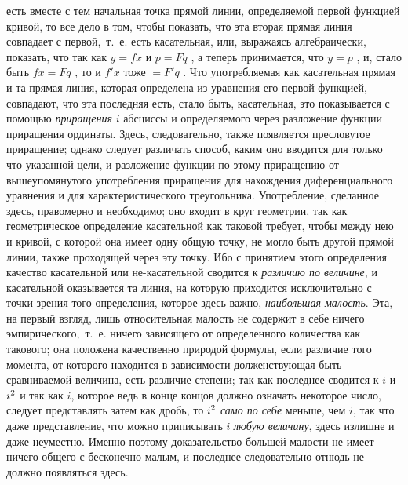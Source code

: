 {есть вместе с тем начальная точка прямой линии, определяемой первой
функцией кривой, то все дело в том, чтобы показать, что эта вторая прямая
линия совпадает с первой,~т.~е. есть касательная, или, выражаясь
алгебраически, показать, что так как $y=\mathit{fx}$  и  $p=\mathit{Fq}$ ,
а теперь принимается, что  $y=p$ , и, стало быть  $\mathit{fx}=\mathit{Fq}$
, то и  $f'x$  тоже  $=F'q$ . Что употребляемая как касательная прямая и та
прямая линия, которая определена из уравнения его первой функцией,
совпадают, что эта последняя есть, стало быть, касательная, это
показывается с помощью {\em приращения}
$i$ абсциссы и определяемого через разложение
функции приращения ординаты. Здесь, следовательно, также появляется
пресловутое приращение; однако следует различать способ, каким оно вводится
для только что указанной цели, и разложение функции по этому приращению от
вышеупомянутого употребления приращения для нахождения диференциального
уравнения и для характеристического треугольника. Употребление, сделанное
здесь, правомерно и необходимо; оно входит в круг геометрии, так как
геометрическое определение касательной как таковой требует, чтобы между нею
и кривой, с которой она имеет одну общую точку, не могло быть другой прямой
линии, также проходящей через эту точку. Ибо с принятием этого определения
качество касательной или не-касательной сводится к
{\em различию по величине}, и касательной оказывается
та линия, на которую приходится исключительно с точки зрения того
определения, которое здесь важно, {\em наибольшая
малость}. Эта, на первый взгляд, лишь относительная малость не содержит в
себе ничего эмпирического,~т.~е. ничего зависящего от определенного
количества как такового; она положена качественно природой формулы, если
различие того момента, от которого находится в зависимости долженствующая
быть сравниваемой величина, есть различие степени; так как последнее
сводится к $i$ и
$i\textsuperscript{2}$ и так как
$i$, которое ведь в конце концов должно означать
некоторое число, следует представлять затем как дробь, то
$i\textsuperscript{2}$
{\em само по себе} меньше, чем
$i$, так что даже представление, что можно
приписывать $i$ {\em любую
величину}, здесь излишне и даже неуместно. Именно поэтому доказательство
большей малости не имеет ничего общего с бесконечно малым, и последнее
следовательно отнюдь не должно появляться здесь.

}
